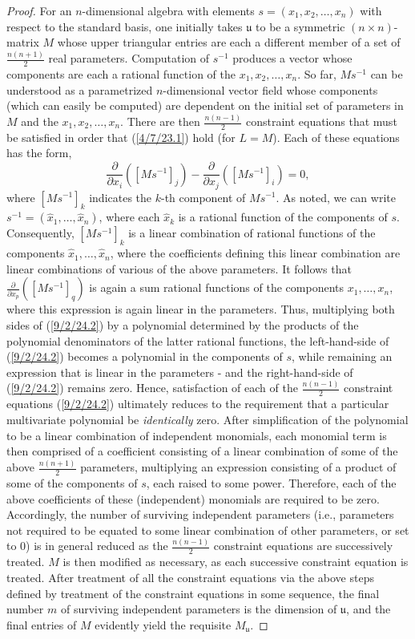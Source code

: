 \documentclass{amsart}
\numberwithin{equation}{section}
\theoremstyle{definition}
\numberwithin{theorem}{section}
\begin{document}
\begin{proof} For an $n$-dimensional algebra with elements $s = (x_1,x_2,\dots,x_n)$ with respect to the standard basis, one initially takes $\mathfrak{u}$ to be a symmetric $(n\times n)$-matrix $M$ whose upper triangular entries are each a different member of a set of $\frac{n(n+1)}{2}$ real parameters.  Computation of $s^{-1}$ produces a vector whose components are each a rational function of the $x_1,x_2,\dots,x_n$.  So far, $Ms^{-1}$ can be understood as a parametrized \mbox{$n$-dimensional} vector field whose components (which can easily be computed) are dependent on the initial set of parameters in $M$ and the $x_1,x_2,\dots,x_n$.  There are then $\frac{n(n-1)}{2}$ constraint equations that must be satisfied in order that (\ref{4/7/23.1}) hold (for $L=M$).  Each of these equations has the form, \begin{equation}\label{9/2/24.2} \frac{\partial}{\partial x_i}([Ms^{-1}]_j) - \frac{\partial}{\partial x_j}([Ms^{-1}]_i) = 0,\end{equation} where $[Ms^{-1}]_k$ indicates the $k$-th component of $Ms^{-1}$.  As noted, we can write $s^{-1} = (\hat{x}_1,\dots,\hat{x}_n)$, where each $\hat{x}_k$ is a rational function of the components of $s$.  Consequently, $[Ms^{-1}]_k$ is a linear combination of rational functions of the components $\hat{x}_1,\dots,\hat{x}_n$, where the coefficients defining this linear combination are linear combinations of various of the above parameters.  It follows that $\frac{\partial}{\partial x_p}([Ms^{-1}]_q)$ is again a sum rational functions of the components $x_1,\dots,x_n$, where this expression is again linear in the parameters.  Thus, multiplying both sides of (\ref{9/2/24.2}) by a polynomial determined by the products of the polynomial denominators of the latter rational functions, the left-hand-side of (\ref{9/2/24.2}) becomes a polynomial in the components of $s$, while remaining an expression that is linear in the parameters - and the right-hand-side of (\ref{9/2/24.2}) remains zero.
Hence, satisfaction of each of the $\frac{n(n-1)}{2}$ constraint equations (\ref{9/2/24.2}) ultimately reduces to the requirement that a particular multivariate polynomial be {\it identically} zero.  After simplification of the polynomial to be a linear combination of independent monomials, each monomial term is then comprised of a coefficient consisting of a linear combination of some of the above $\frac{n(n+1)}{2}$ parameters, multiplying an expression consisting of a product of some of the components of $s$, each raised to some power.  Therefore, each of the above coefficients of these (independent) monomials are required to be zero.  Accordingly, the number of surviving independent parameters (i.e., parameters not required to be equated to some linear combination of other parameters, or set to 0) is in general reduced as the $\frac{n(n-1)}{2}$ constraint equations are successively treated.  $M$ is then modified as necessary, as each successive constraint equation is treated.  After treatment of all the constraint equations via the above steps defined by treatment of the constraint equations in some sequence, the final number $m$ of surviving independent parameters is the dimension of $\mathfrak{u}$, and the final entries of $M$ evidently yield the requisite $M_\mathfrak{u}$.

\end{proof}
\end{document}
